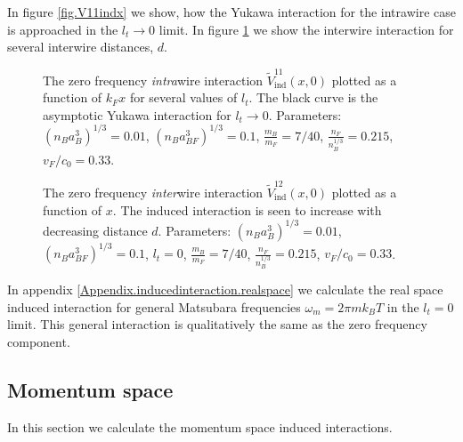 In figure \ref{fig.V11indx} we show, how the Yukawa interaction for the intrawire case is approached in the $l_t\to 0$ limit. In figure \ref{fig.V12indx} we show the interwire interaction for several interwire distances, $d$. 

\begin{figure} 
\begin{center}  
  
\caption{The zero frequency \textit{intra}wire interaction $\tilde{V}^{11}_{\text{ind}}(x,0)$ plotted as a function of $k_Fx$ for several values of $l_t$. The black curve is the asymptotic Yukawa interaction for $l_t \to 0$. Parameters: $(n_Ba_B^3)^{1/3} = 0.01$, $(n_Ba_{BF}^3)^{1/3} = 0.1$, $\frac{m_B}{m_F} = 7/40$, $\frac{n_F}{n_B^{1/3}} = 0.215$, $v_F/c_0 = 0.33$.}  
\label{fig.V11indx}  
\vspace{0.5cm}
  
\caption{The zero frequency \textit{inter}wire interaction $\tilde{V}_{\text{ind}}^{12}(x,0)$ plotted as a function of $x$. The induced interaction is seen to increase with decreasing distance $d$. Parameters: $(n_Ba_B^3)^{1/3} = 0.01$, $(n_Ba_{BF}^3)^{1/3} = 0.1$, $l_t = 0$, $\frac{m_B}{m_F} = 7/40$, $\frac{n_F}{n_B^{1/3}} = 0.215$, $v_F/c_0 = 0.33$.}  
\label{fig.V12indx}  
\end{center}    
\end{figure}

In appendix \ref{Appendix.inducedinteraction.realspace} we calculate the real space induced interaction for general Matsubara frequencies $\omega_m = 2\pi m k_BT$ in the $l_t = 0$ limit. This general interaction is qualitatively the same as the zero frequency component.  

\subsection{Momentum space}
\label{subsec.inducedinteraction.momentumspace}
In this section we calculate the momentum space induced interactions.

